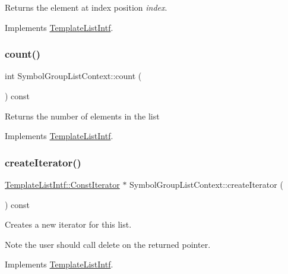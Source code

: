 Returns the element at index position {\itshape index}. 

Implements \mbox{\hyperlink{class_template_list_intf_aa51e57e72eacf4e8ce1055ee30a0f7f8}{Template\+List\+Intf}}.

\mbox{\label{class_symbol_group_list_context_ad3561a3a506b3e9026b11e7dba59ad07}} 
\subsubsection{\texorpdfstring{count()}{count()}}
{\footnotesize\ttfamily int Symbol\+Group\+List\+Context\+::count (\begin{DoxyParamCaption}{ }\end{DoxyParamCaption}) const\hspace{0.3cm}{\ttfamily [virtual]}}

Returns the number of elements in the list 

Implements \mbox{\hyperlink{class_template_list_intf_a329e49e33484c2aa5106aac1bf4e5216}{Template\+List\+Intf}}.

\mbox{\label{class_symbol_group_list_context_a0ce2ecdbdb99934092e50b4320bb6242}} 
\subsubsection{\texorpdfstring{createIterator()}{createIterator()}}
{\footnotesize\ttfamily \mbox{\hyperlink{class_template_list_intf_1_1_const_iterator}{Template\+List\+Intf\+::\+Const\+Iterator}} $\ast$ Symbol\+Group\+List\+Context\+::create\+Iterator (\begin{DoxyParamCaption}{ }\end{DoxyParamCaption}) const\hspace{0.3cm}{\ttfamily [virtual]}}

Creates a new iterator for this list. \begin{DoxyNote}{Note}
the user should call delete on the returned pointer. 
\end{DoxyNote}


Implements \mbox{\hyperlink{class_template_list_intf_a56b82384db24c3e121076a1da046d378}{Template\+List\+Intf}}.

